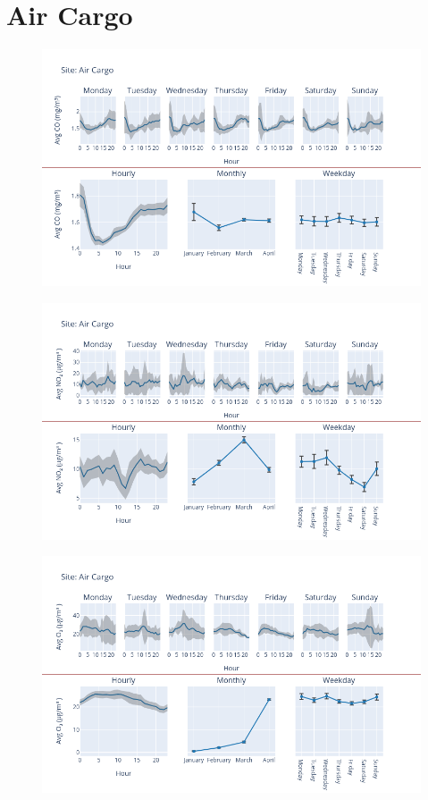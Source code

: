 \documentclass[12pt, oneside]{book}
\begin{document}
{\section{Air Cargo}
{\begin{figure}[H] 
 \centering 
\includegraphics[width=.88\textwidth, keepaspectratio]{image38} 
 \end{figure}}{} 

{\begin{figure}[H] 
 \centering 
\includegraphics[width=.88\textwidth, keepaspectratio]{image39} 
 \end{figure}}{} 

{\begin{figure}[H] 
 \centering 
\includegraphics[width=.88\textwidth, keepaspectratio]{image40} 
 \end{figure}}{} 

}
\end{document}
